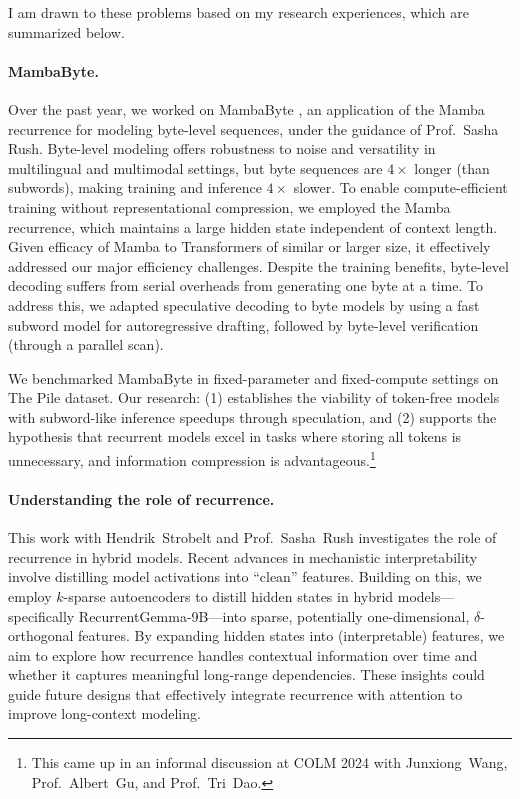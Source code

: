 I am drawn to these problems based on my research experiences, which are summarized below.

\paragraph{MambaByte.}

Over the past year, we worked on MambaByte \citep{wang_mambabyte_2024}, an application of the Mamba recurrence \citep{gu_mamba_2024} for modeling byte-level sequences, under the guidance of Prof.~Sasha Rush.
%
Byte-level modeling offers robustness to noise and versatility in multilingual and multimodal settings, but byte sequences are $4\times$ longer (than subwords), making training and inference $4\times$ slower.
%
To enable compute-efficient training without representational compression, we employed the Mamba recurrence, which maintains a large hidden state independent of context length.
%
Given efficacy of Mamba to Transformers of similar or larger size, it effectively addressed our major efficiency challenges.
%
Despite the training benefits, byte-level decoding suffers from serial overheads from generating one byte at a time.
%
To address this, we adapted speculative decoding \citep{leviathan_fast_2023} to byte models by using a fast subword model for autoregressive drafting, followed by byte-level verification (through a parallel scan).

We benchmarked MambaByte in fixed-parameter and fixed-compute settings on The Pile dataset.
%
Our research: (1) establishes the viability of token-free models with subword-like inference speedups through speculation, and (2) supports the hypothesis that recurrent models excel in tasks where storing all tokens is unnecessary, and information compression is advantageous.\footnote{This came up in an informal discussion at COLM 2024 with Junxiong~Wang, Prof.~Albert~Gu, and Prof.~Tri~Dao.}


\paragraph{Understanding the role of recurrence.}

This work with Hendrik~Strobelt and Prof.~Sasha~Rush investigates the role of recurrence in hybrid models.
%
Recent advances in mechanistic interpretability involve distilling model activations into ``clean'' features.
%
Building on this, we employ $k$-sparse autoencoders to distill hidden states in hybrid models---specifically RecurrentGemma-9B---into sparse, potentially one-dimensional, $\delta$-orthogonal features.
%
By expanding hidden states into (interpretable) features, we aim to explore how recurrence handles contextual information over time and whether it captures meaningful long-range dependencies.
% 
These insights could guide future designs that effectively integrate recurrence with attention to improve long-context modeling.

